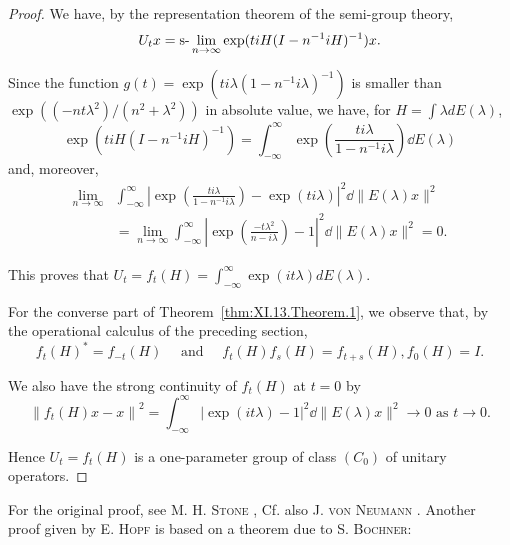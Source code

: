 \begin{proof}
 We have, by the representation theorem of the semi-group theory, 
\[
U _{t} x = \text{s-}\lim _{n \to \infty} \exp (t i H (I - n ^{-1} i H) ^{-1}) x. \]

Since the function $g(t) = \exp (ti\lambda (1 - n^{-1}i\lambda)^{-1})$ is smaller than $\exp ((-nt\lambda^2) / (n^2 +\lambda^2))$ in absolute value, we have, for $H = \int \lambda dE(\lambda)$, 
\[
\exp (t i H (I - n ^{-1} i H) ^{-1}) = \int_{- \infty} ^{\infty} \exp \left(\frac {t i \lambda}{1 - n ^{-1} i \lambda}\right) \dd E (\lambda)
\]
and, moreover, 
\[
\begin{aligned}
\lim\limits _{n \rightarrow \infty}& \int_{- \infty} ^{\infty} \left| \exp \left(\frac {t i \lambda}{1 - n ^{-1} i \lambda}\right) - \exp (t i \lambda) \right| ^{2} \dd \| E (\lambda) x \| ^{2}
\\
&= \lim\limits _{n \rightarrow \infty} \int_{- \infty} ^{\infty} \left| \exp \left(\frac {- t \lambda^{2}}{n - i \lambda}\right) - 1 \right| ^{2} \dd \| E (\lambda) x \| ^{2} = 0.
\end{aligned}
\]

This proves that $U_{t} = f_{t}(H) = \int_{-\infty}^{\infty}\exp (it\lambda)dE(\lambda).$ 

For the converse part of Theorem~\ref{thm:XI.13.Theorem.1}, we observe that, by the operational calculus of the preceding section, 
\[
f _{t} (H) ^{*} = f _{-t} (H) \quad \text{ and } \quad f _{t} (H) f _{s} (H) = f _{t+s} (H), f _{0} (H) = I.
\]

We also have the strong continuity of $f_{t}(H)$ at $t = 0$ by 
\[
\left\| f _{t} (H) x - x \right\| ^{2} = \int_{- \infty} ^{\infty} | \exp (i t \lambda) - 1 | ^{2} \dd \| E (\lambda) x \| ^{2} \rightarrow 0 \text{ as } t \rightarrow 0.
\]

Hence $U_{t} = f_{t}(H)$ is a one-parameter group of class $(C_0)$ of unitary operators. 
\end{proof}

\begin{remarku} For the original proof, see M. H. \textsc{Stone} \cite{stone312}, Cf. also J. \textsc{von} \textsc{Neumann} \cite{neumann235}. Another proof given by E. \textsc{Hopf} \cite{hirsch109} is based on a theorem due to S. \textsc{Bochner}: 
\end{remarku}

